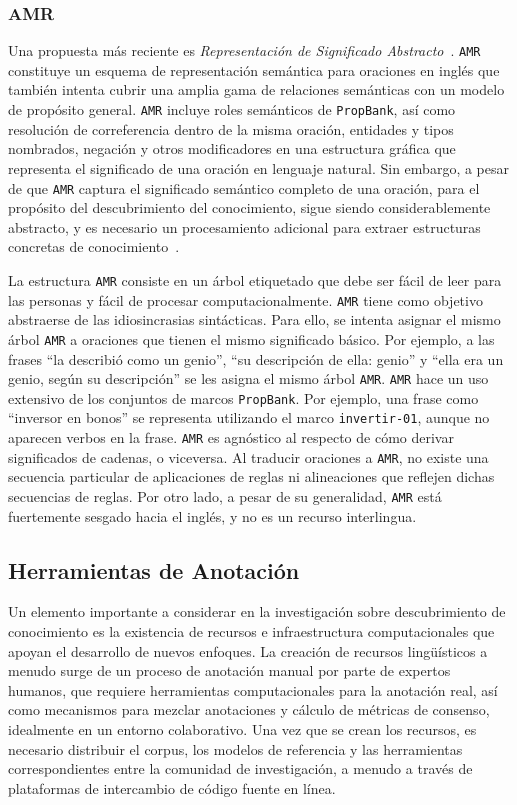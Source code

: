 \subsubsection*{AMR}

Una propuesta más reciente es \textit{Representación de Significado Abstracto}~\cite[AMR]{amr}.
\texttt{AMR} constituye un esquema de representación semántica para oraciones en inglés que también intenta cubrir una amplia gama de relaciones semánticas con un modelo de propósito general.
\texttt{AMR} incluye roles semánticos de \texttt{PropBank}, así como resolución de correferencia dentro de la misma oración, entidades y tipos nombrados, negación y otros modificadores en una estructura gráfica que representa el significado de una oración en lenguaje natural.
Sin embargo, a pesar de que \texttt{AMR} captura el significado semántico completo de una oración, para el propósito del descubrimiento del conocimiento, sigue siendo considerablemente abstracto, y es necesario un procesamiento adicional para extraer estructuras concretas de conocimiento~\cite{rao2017biomedical}.

La estructura \texttt{AMR} consiste en un árbol etiquetado que debe ser fácil de leer para las personas y fácil de procesar computacionalmente.
\texttt{AMR} tiene como objetivo abstraerse de las idiosincrasias sintácticas.
Para ello, se intenta asignar el mismo árbol \texttt{AMR} a oraciones que tienen el mismo significado básico.
Por ejemplo, a las frases ``la describió como un genio'', ``su descripción de ella: genio'' y ``ella era un genio, según su descripción'' se les asigna el mismo árbol \texttt{AMR}.
\texttt{AMR} hace un uso extensivo de los conjuntos de marcos \texttt{PropBank}.
Por ejemplo, una frase como ``inversor en bonos'' se representa utilizando el marco \texttt{invertir-01}, aunque no aparecen verbos en la frase.
\texttt{AMR} es agnóstico al respecto de cómo derivar significados de cadenas, o viceversa.
Al traducir oraciones a \texttt{AMR}, no existe una secuencia particular de aplicaciones de reglas ni alineaciones que reflejen dichas secuencias de reglas.
Por otro lado, a pesar de su generalidad, \texttt{AMR} está fuertemente sesgado hacia el inglés, y no es un recurso interlingua.

\subsection{Herramientas de Anotación}\label{subsec:annotation-tools}

Un elemento importante a considerar en la investigación sobre descubrimiento de conocimiento es la existencia de recursos e infraestructura computacionales que apoyan el desarrollo de nuevos enfoques.
La creación de recursos lingüísticos a menudo surge de un proceso de anotación manual por parte de expertos humanos, que requiere herramientas computacionales para la anotación real, así como mecanismos para mezclar anotaciones y cálculo de métricas de consenso, idealmente en un entorno colaborativo.
Una vez que se crean los recursos, es necesario distribuir el corpus, los modelos de referencia y las herramientas correspondientes entre la comunidad de investigación, a menudo a través de plataformas de intercambio de código fuente en línea.

